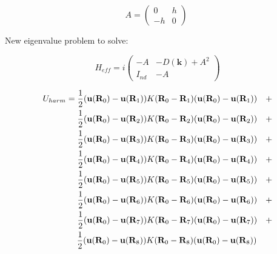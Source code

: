 \documentclass[a5paper,12pt]{article}
\begin{document}
\begin{equation} 
A =\left( \begin{array}{cc} 0 & h \\ 
-h & 0 \end{array} \right)\;
\end{equation}



New eigenvalue problem to solve:

\begin{equation}
H_{eff}= i\left( \begin{array}{cc} -A & -D(\mathbf{k}) + A^2 \\
I_{nd} & -A \end{array} \right)
\end{equation}

\newpage


\begin{equation}
 \begin{aligned}
U_{harm} = \newline
\frac{1}{2}(\mathbf{u}(\mathbf{R}_0) - \mathbf{u}(\mathbf{R}_1))
K(\mathbf{R}_0-\mathbf{R}_1)
(\mathbf{u}(\mathbf{R}_0) - \mathbf{u}(\mathbf{R}_1))\quad + \\
\frac{1}{2}(\mathbf{u}(\mathbf{R}_0) - \mathbf{u}(\mathbf{R}_2))
K(\mathbf{R}_0-\mathbf{R}_2)
(\mathbf{u}(\mathbf{R}_0) - \mathbf{u}(\mathbf{R}_2))\quad +  \\
\frac{1}{2}(\mathbf{u}(\mathbf{R}_0) - \mathbf{u}(\mathbf{R}_3))
K(\mathbf{R}_0-\mathbf{R}_3)
(\mathbf{u}(\mathbf{R}_0) - \mathbf{u}(\mathbf{R}_3))\quad +  \\
\frac{1}{2}(\mathbf{u}(\mathbf{R}_0) - \mathbf{u}(\mathbf{R}_4))
K(\mathbf{R}_0-\mathbf{R}_4)
(\mathbf{u}(\mathbf{R}_0) - \mathbf{u}(\mathbf{R}_4))\quad +  \\
\frac{1}{2}(\mathbf{u}(\mathbf{R}_0) - \mathbf{u}(\mathbf{R}_5))
K(\mathbf{R}_0-\mathbf{R}_5)
(\mathbf{u}(\mathbf{R}_0) - \mathbf{u}(\mathbf{R}_5))\quad +  \\
\frac{1}{2}(\mathbf{u}(\mathbf{R}_0) - \mathbf{u}(\mathbf{R}_6))
K(\mathbf{R}_0-\mathbf{R}_6)
(\mathbf{u}(\mathbf{R}_0) - \mathbf{u}(\mathbf{R}_6))\quad +  \\
\frac{1}{2}(\mathbf{u}(\mathbf{R}_0) - \mathbf{u}(\mathbf{R}_7))
K(\mathbf{R}_0-\mathbf{R}_7)
(\mathbf{u}(\mathbf{R}_0) - \mathbf{u}(\mathbf{R}_7))\quad +  \\
\frac{1}{2}(\mathbf{u}(\mathbf{R}_0) - \mathbf{u}(\mathbf{R}_8))
K(\mathbf{R}_0-\mathbf{R}_8)
(\mathbf{u}(\mathbf{R}_0) - \mathbf{u}(\mathbf{R}_8))\quad \;\;\;  \\
\end{aligned} \nonumber
\end{equation}
\end{document}
